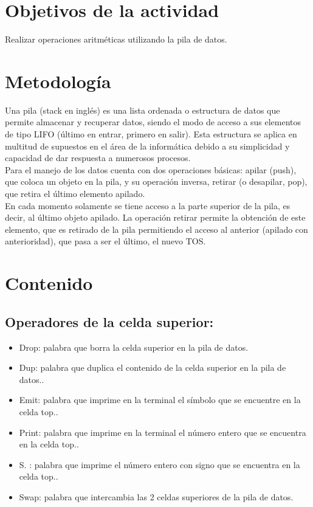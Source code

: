 \documentclass[conference]{IEEEtran}
\begin{document}
\section{Objetivos de la actividad}
\begin{center}
 Realizar operaciones aritméticas utilizando la pila de datos.
\end{center}

\section{Metodología}
Una pila (stack en inglés) es una lista ordenada o estructura de datos que permite almacenar y recuperar datos, siendo el modo de acceso a sus elementos de tipo LIFO (último en entrar, primero en salir). Esta estructura se aplica en multitud de supuestos en el área de la informática debido a su simplicidad y capacidad de dar respuesta a numerosos procesos.\\

Para el manejo de los datos cuenta con dos operaciones básicas: apilar (push), que coloca un objeto en la pila, y su operación inversa, retirar (o desapilar, pop), que retira el último elemento apilado.\\

En cada momento solamente se tiene acceso a la parte superior de la pila, es decir, al último objeto apilado. La operación retirar permite la obtención de este elemento, que es retirado de la pila permitiendo el acceso al anterior (apilado con anterioridad), que pasa a ser el último, el nuevo TOS.

\section{Contenido}
\subsection{Operadores de la celda superior:}
\begin{itemize}
\item Drop: palabra que borra la celda superior en la pila de datos.
\item Dup: palabra que duplica el contenido de la celda superior en la pila de datos..
\item Emit: palabra que imprime en la terminal el símbolo que se encuentre en la celda top..
\item Print: palabra que imprime en la terminal el número entero que se encuentra en la celda top..
\item S. : palabra que imprime el número entero con signo que se encuentra en la celda top..
\item Swap: palabra que intercambia las 2 celdas superiores de la pila de datos.
\end{itemize}
\end{document}
